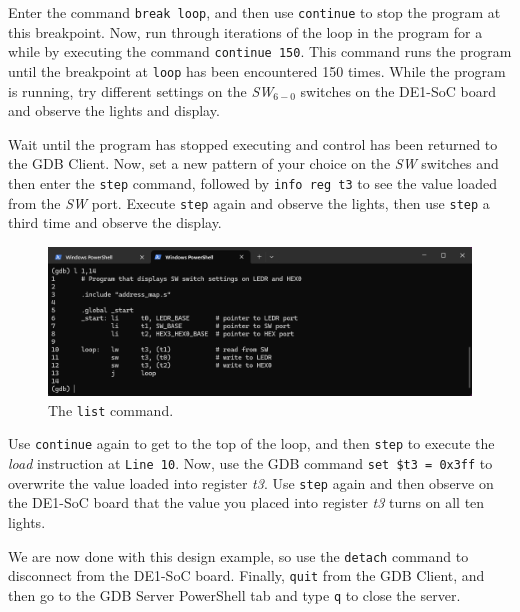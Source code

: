 \documentclass[11pt, twoside, pdftex]{article}
\newcommand{\red}[1]{{\color{red}\sf{#1}}}
\begin{document}
Enter the command \texttt{break loop}, and 
then use \texttt{continue} to stop the program at this breakpoint.
Now, run through iterations of the loop in the program for a while by executing the 
command \texttt{continue 150}. This command runs the
program until the breakpoint at \texttt{loop} has been encountered 150 times. While the 
program is running, try different settings on the {\it SW}$_{6-0}$ switches on the DE1-SoC 
board and observe the \red{\it LEDR} lights and \red{\it HEX0} display. 

Wait until the program has stopped executing and control has been returned to the GDB
Client. Now, set a new pattern of your choice on the {\it SW} switches and then enter
the \texttt{step} command, followed by \texttt{info reg t3} to see the value loaded from 
the {\it SW} port. Execute \texttt{step} again and observe the \red{\it LEDR} lights, 
then use \texttt{step} a third time and observe the \red{\it HEX0} display. 

\begin{figure}[h]
    \begin{center}
        \includegraphics[scale=.6]{figures/display_s2.png}
        \caption{The \texttt{list} command.}
        \label{fig:display_s2}
    \end{center}
\end{figure}

Use \texttt{continue} again to get to the top of the loop, and then \texttt{step} to
execute the {\it load} instruction at \texttt{Line 10}. Now, use the GDB command 
\texttt{set \$t3 = 0x3ff} to overwrite the value loaded into register {\it t3}. Use
\texttt{step} again and then observe on the DE1-SoC board that the value you placed 
into register {\it t3} turns on all ten \red{\it LEDR} lights. 

We are now done with this design example, so use the \texttt{detach} command to disconnect
from the DE1-SoC board. Finally, \texttt{quit} from the GDB Client, and then go to the
GDB Server PowerShell tab and type \texttt{q} to close the server.
\end{document}
